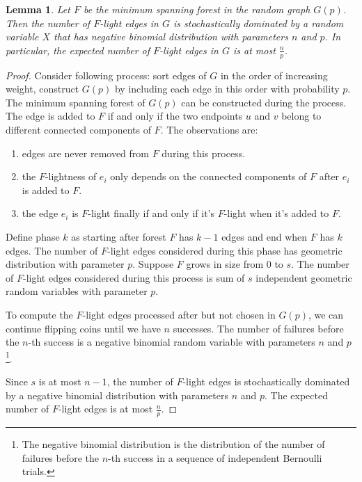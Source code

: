 \documentclass[11pt]{article}
\theoremstyle{plain}
\newtheorem{lemma}{Lemma}[section]
\begin{document}
\begin{lemma}
    \label{lemma:randomizedmst}
    Let $F$ be the minimum spanning forest in the random graph $G(p)$. Then the number of $F$-light edges in $G$ is stochastically dominated by a random variable $X$ that has negative binomial distribution with parameters $n$ and $p$. In particular, the expected number of $F$-light edges in $G$ is at most $\frac{n}{p}$.
\end{lemma}
\begin{proof}
    Consider following process: sort edges of $G$ in the order of increasing weight, construct $G(p)$ by including each edge in this order with probability $p$. The minimum spanning forest of $G(p)$ can be constructed during the process. The edge is added to $F$ if and only if the two endpoints $u$ and $v$ belong to different connected components of $F$. The observations are:
    \begin{enumerate}
        \item edges are never removed from $F$ during this process.
        \item the $F$-lightness of $e_i$ only depends on the connected components of $F$ after $e_i$ is added to $F$.
        \item the edge $e_i$ is $F$-light finally if and only if it's $F$-light when it's added to $F$.
    \end{enumerate}
    Define phase $k$ as starting after forest $F$ has $k-1$ edges and end when $F$ has $k$ edges. The number of $F$-light edges considered during this phase has geometric distribution with parameter $p$. Suppose $F$ grows in size from 0 to $s$. The number of $F$-light edges considered during this process is sum of $s$ independent geometric random variables with parameter $p$.

    To compute the $F$-light edges processed after but not chosen in $G(p)$, we can continue flipping coins until we have $n$ successes. The number of failures before the $n$-th success is a negative binomial random variable with parameters $n$ and $p$\footnote{The negative binomial distribution is the distribution of the number of failures before the $n$-th success in a sequence of independent Bernoulli trials.}. 

    Since $s$ is at most $n-1$, the number of $F$-light edges is stochastically dominated by a negative binomial distribution with parameters $n$ and $p$. The expected number of $F$-light edges is at most $\frac{n}{p}$.
\end{proof}
\end{document}
